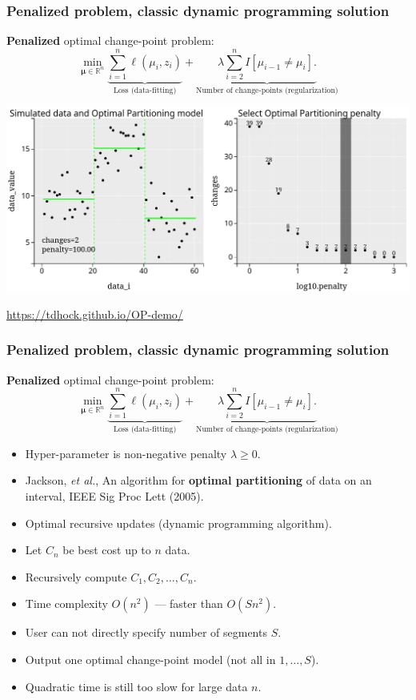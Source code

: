 \documentclass{beamer}
\newcommand{\RR}{\mathbb R}
\begin{document}
\begin{frame}
  \frametitle{Penalized problem, classic dynamic programming solution}
  \textbf{Penalized} optimal change-point problem:
$$
\min_{
  \mathbf \mu\in\RR^{n}
}
\underbrace{\sum_{i=1}^{n} \ell( \mu_i,  z_i)}_{\text{Loss (data-fitting)}} + \underbrace{\lambda\sum_{i=2}^n I[\mu_{i-1}\neq \mu_i].}_{\text{Number of change-points (regularization)}}
$$

\includegraphics[width=\textwidth]{OP-demo} 

\url{https://tdhock.github.io/OP-demo/}

\end{frame}

\begin{frame}
  \frametitle{Penalized problem, classic dynamic programming solution}
  \textbf{Penalized} optimal change-point problem:
$$
\min_{
  \mathbf \mu\in\RR^{n}
}
\underbrace{\sum_{i=1}^{n} \ell( \mu_i,  z_i)}_{\text{Loss (data-fitting)}} + \underbrace{\lambda\sum_{i=2}^n I[\mu_{i-1}\neq \mu_i].}_{\text{Number of change-points (regularization)}}
$$
\begin{itemize}
\item Hyper-parameter is non-negative penalty $\lambda\geq 0$.
\item Jackson, \emph{et al.}, An algorithm for \textbf{optimal
    partitioning} of data on an interval, IEEE Sig Proc Lett (2005).
\item Optimal recursive updates (dynamic programming algorithm).
\item Let $C_{n}$ be best cost up to $n$ data.
\item Recursively compute $C_{1}, C_2,\dots, C_{n}$.
\item Time complexity $O(n^2)$ --- faster than $O(S n^2)$.
\item User can not directly specify number of segments $S$.
\item Output one optimal change-point model (not all in $1,\dots,S$).
\item Quadratic time is still too slow for large data $n$.
\end{itemize}
\end{frame}
\end{document}
